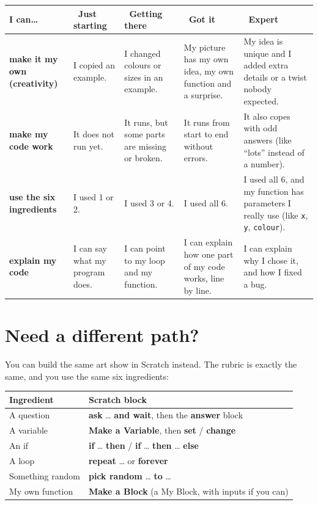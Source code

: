 \documentclass[level=1]{kidscode}
\newcommand{\lvA}{\faSeedling\ Just starting}
\newcommand{\lvB}{\faShoePrints\ Getting there}
\newcommand{\lvC}{\faCheckCircle\ Got it}
\newcommand{\lvD}{\faRocket\ Expert}
\begin{document}
{\small\renewcommand{\arraystretch}{1.3}
\begin{tabularx}{\linewidth}{@{}>{\bfseries\RaggedRight}p{2.5cm}*{4}{>{\RaggedRight\arraybackslash}X}@{}}
\toprule
I can\dots & \lvA & \lvB & \lvC & \lvD\\
\midrule
make it my own (creativity) & I copied an example. & I changed colours or sizes in an example. & My picture has my own idea, my own function and a surprise. & My idea is unique and I added extra details or a twist nobody expected.\\
\midrule
make my code work & It does not run yet. & It runs, but some parts are missing or broken. & It runs from start to end without errors. & It also copes with odd answers (like \enquote{lots} instead of a number).\\
\midrule
use the six ingredients & I used 1 or 2. & I used 3 or 4. & I used all 6. & I used all 6, and my function has parameters I really use (like \texttt{x}, \texttt{y}, \texttt{colour}).\\
\midrule
explain my code & I can say what my program does. & I can point to my loop and my function. & I can explain how one part of my code works, line by line. & I can explain why I chose it, and how I fixed a bug.\\
\bottomrule
\end{tabularx}}

\section{Need a different path?}
\begin{tip}
You can build the same art show in Scratch instead. The rubric is exactly the same,
and you use the same six ingredients:
\begin{center}
\small\renewcommand{\arraystretch}{1.3}
\begin{tabular}{@{}ll@{}}
\toprule
Ingredient & Scratch block\\
\midrule
A question & \textbf{ask} \dots{} \textbf{and wait}, then the \textbf{answer} block\\
A variable & \textbf{Make a Variable}, then \textbf{set} / \textbf{change}\\
An if & \textbf{if} \dots{} \textbf{then} / \textbf{if} \dots{} \textbf{then} \dots{} \textbf{else}\\
A loop & \textbf{repeat} \dots{} or \textbf{forever}\\
Something random & \textbf{pick random} \dots{} \textbf{to} \dots\\
My own function & \textbf{Make a Block} (a My Block, with inputs if you can)\\
\bottomrule
\end{tabular}
\end{center}
\end{tip}
\end{document}
